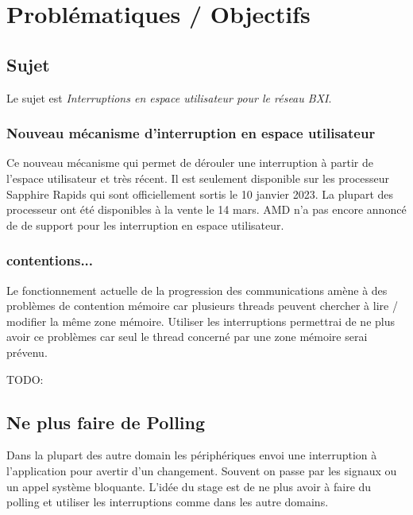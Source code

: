 \section{Problématiques / Objectifs} %

\subsection{Sujet}

Le sujet est \emph{Interruptions en espace utilisateur pour le réseau BXI}.

\subsubsection{Nouveau mécanisme d'interruption en espace utilisateur}

Ce nouveau mécanisme qui permet de dérouler une interruption à partir de l'espace utilisateur et très récent.
Il est seulement disponible sur les processeur \intel{} Sapphire Rapids qui sont officiellement sortis le 10 janvier 2023.
La plupart des processeur ont été disponibles à la vente le 14 mars.
AMD n'a pas encore annoncé de de support pour les interruption en espace utilisateur.

\subsubsection{contentions...} %

Le fonctionnement actuelle de la progression des communications amène à des problèmes de contention mémoire car plusieurs threads peuvent chercher à lire / modifier la même zone mémoire.
Utiliser les interruptions permettrai de ne plus avoir ce problèmes car seul le thread concerné par une zone mémoire serai prévenu.

TODO: 

\subsection{Ne plus faire de Polling}

Dans la plupart des autre domain les périphériques envoi une interruption à l'application pour avertir d'un changement.
Souvent on passe par les signaux ou un appel système bloquante.
L'idée du stage est de ne plus avoir à faire du polling et utiliser les interruptions comme dans les autre domains.

